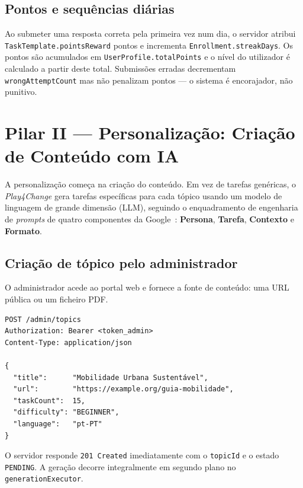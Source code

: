 \subsection*{Pontos e sequências diárias}

Ao submeter uma resposta correta pela primeira vez num dia, o servidor
atribui \texttt{TaskTemplate.pointsReward} pontos e incrementa
\texttt{Enrollment.streakDays}.
Os pontos são acumulados em \texttt{UserProfile.totalPoints} e o nível
do utilizador é calculado a partir deste total.
Submissões erradas decrementam \texttt{wrongAttemptCount} mas não penalizam
pontos — o sistema é encorajador, não punitivo.

\section{Pilar II — Personalização: Criação de Conteúdo com IA}
\label{sec:pilar_criacao_ia}

A personalização começa na criação do conteúdo.
Em vez de tarefas genéricas, o \textit{Play4Change} gera tarefas
específicas para cada tópico usando um modelo de linguagem de grande
dimensão (LLM), seguindo o enquadramento de engenharia de
\textit{prompts} de quatro componentes da Google~\cite{google2024promptguide}:
\textbf{Persona}, \textbf{Tarefa}, \textbf{Contexto} e \textbf{Formato}.

\subsection*{Criação de tópico pelo administrador}

O administrador acede ao portal web e fornece a fonte de conteúdo:
uma URL pública ou um ficheiro PDF.

\begin{verbatim}
POST /admin/topics
Authorization: Bearer <token_admin>
Content-Type: application/json

{
  "title":      "Mobilidade Urbana Sustentável",
  "url":        "https://example.org/guia-mobilidade",
  "taskCount":  15,
  "difficulty": "BEGINNER",
  "language":   "pt-PT"
}
\end{verbatim}

O servidor responde \texttt{201 Created} imediatamente com o
\texttt{topicId} e o estado \texttt{PENDING}.
A geração decorre integralmente em segundo plano no
\texttt{generationExecutor}.

